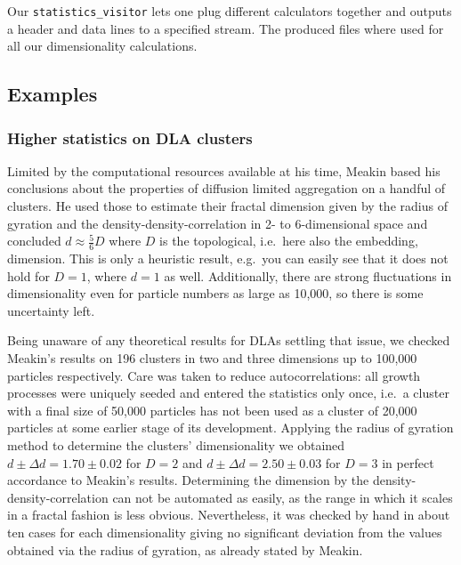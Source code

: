 \documentclass[twocolumn, 10pt]{scrartcl}
\begin{document}
                Our \lstinline'statistics_visitor' lets one plug different calculators together and outputs a header and
                data lines to a specified stream. The produced files where used for all our dimensionality calculations.

        \subsection{Examples}
           \subsubsection{Higher statistics on DLA clusters}
                Limited by the computational resources available at his time, Meakin based his conclusions about
                the properties of diffusion limited aggregation on a handful of clusters. He used those to estimate
                their fractal dimension given by the radius of gyration and the density-density-correlation in
                2- to 6-dimensional space and concluded $d\approx\frac{5}{6}D$ where $D$ is the topological, i.e.\ here
                also the embedding, dimension. This is only a heuristic result, e.g.\ you can easily see that it does
                not hold for $D=1$, where $d=1$ as well. Additionally, there are strong fluctuations in dimensionality
                even for particle numbers as large as 10,000, so there is some uncertainty left.
                
                Being unaware of any
                theoretical results for DLAs settling that issue, we checked Meakin's results on 196 clusters in
                two and three dimensions up to 100,000 particles respectively. Care was taken to reduce
                autocorrelations: all growth
                processes were uniquely seeded and entered the statistics only once, i.e.\ a cluster with a final
                size of 50,000 particles has not been used as a cluster of 20,000 particles at some earlier stage
                of its development. Applying the radius of gyration method to determine the clusters' dimensionality
                we obtained $d\pm\Delta d=1.70\pm0.02$ for $D=2$ and $d\pm\Delta d=2.50\pm0.03$ for $D=3$ in perfect
                accordance to Meakin's results. Determining the dimension by the density-density-correlation can
                not be automated as easily, as the range in which it scales in a fractal fashion is less obvious.
                Nevertheless, it was checked by hand in about ten cases for each dimensionality giving no significant
                deviation from the values obtained via the radius of gyration, as already stated by Meakin.
\end{document}
